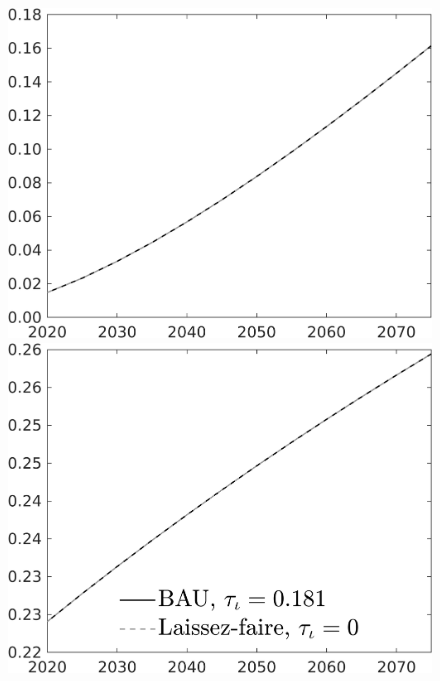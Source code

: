 \documentclass[12pt]{article}
\begin{document}
\begin{figure}[h!!]
\begin{minipage}[]{0.32\textwidth}
	\end{minipage}
	\begin{minipage}[]{0.32\textwidth}
		\includegraphics[width=1\textwidth]{../../codding_model/own_basedOnFried/optimalPol_010922_revision/figures/all_13Sept22/CompTaul_Equlab_LFBAU_Reg0_AgAf_spillover0_nsk1_xgr0_knspil0_sep1_countec0_GovRev0_etaa0.79_lgd0.png}
	\end{minipage}
	\begin{minipage}[]{0.32\textwidth}
		\includegraphics[width=1\textwidth]{../../codding_model/own_basedOnFried/optimalPol_010922_revision/figures/all_13Sept22/CompTaul_Equlab_LFBAU_Reg0_pf_spillover0_nsk1_xgr0_knspil0_sep1_countec0_GovRev0_etaa0.79_lgd1.png}

\end{minipage}
\end{figure}
\end{document}
